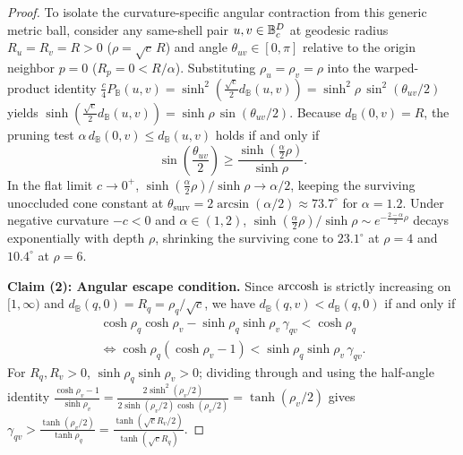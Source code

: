 \begin{proof}
To isolate the curvature-specific angular contraction from this generic metric ball, consider any same-shell pair $u, v \in \mathbb{B}_c^D$ at geodesic radius $R_u = R_v = R > 0$ ($\rho = \sqrt{c}\,R$) and angle $\theta_{uv} \in [0, \pi]$ relative to the origin neighbor $p = 0$ ($R_p = 0 < R/\alpha$).
Substituting $\rho_u = \rho_v = \rho$ into the warped-product identity $\frac{c}{4}P_{\mathbb{B}}(u, v) = \sinh^2(\frac{\sqrt{c}}{2}d_{\mathbb{B}}(u, v)) = \sinh^2\rho\,\sin^2(\theta_{uv}/2)$ yields $\sinh(\frac{\sqrt{c}}{2}d_{\mathbb{B}}(u, v)) = \sinh\rho\,\sin(\theta_{uv}/2)$.
Because $d_{\mathbb{B}}(0, v) = R$, the pruning test $\alpha\,d_{\mathbb{B}}(0, v) \le d_{\mathbb{B}}(u, v)$ holds if and only if
\begin{equation}
  \sin\!\left(\frac{\theta_{uv}}{2}\right) \ge \frac{\sinh\!\left(\frac{\alpha}{2}\rho\right)}{\sinh\rho}.
\end{equation}
In the flat limit $c \to 0^+$, $\sinh(\frac{\alpha}{2}\rho)/\sinh\rho \to \alpha / 2$, keeping the surviving unoccluded cone constant at $\theta_{\mathrm{surv}} = 2\arcsin(\alpha/2) \approx 73.7^\circ$ for $\alpha = 1.2$.
Under negative curvature $-c < 0$ and $\alpha \in (1, 2)$, $\sinh(\frac{\alpha}{2}\rho)/\sinh\rho \sim e^{-\frac{2-\alpha}{2}\rho}$ decays exponentially with depth $\rho$, shrinking the surviving cone to $23.1^\circ$ at $\rho = 4$ and $10.4^\circ$ at $\rho = 6$.

\textbf{Claim (2): Angular escape condition.}
Since $\operatorname{arccosh}$ is strictly increasing on $[1, \infty)$ and $d_{\mathbb{B}}(q, 0) = R_q = \rho_q / \sqrt{c}$, we have $d_{\mathbb{B}}(q, v) < d_{\mathbb{B}}(q, 0)$ if and only if
\begin{equation}
  \begin{gathered}
    \cosh\rho_q\cosh\rho_v - \sinh\rho_q\sinh\rho_v\,\gamma_{qv} < \cosh\rho_q \\
    \iff \cosh\rho_q(\cosh\rho_v - 1) < \sinh\rho_q\sinh\rho_v\,\gamma_{qv}.
  \end{gathered}
\end{equation}
For $R_q, R_v > 0$, $\sinh\rho_q\sinh\rho_v > 0$; dividing through and using the half-angle identity $\frac{\cosh\rho_v - 1}{\sinh\rho_v} = \frac{2\sinh^2(\rho_v/2)}{2\sinh(\rho_v/2)\cosh(\rho_v/2)} = \tanh(\rho_v/2)$ gives $\gamma_{qv} > \frac{\tanh(\rho_v/2)}{\tanh\rho_q} = \frac{\tanh(\sqrt{c}R_v/2)}{\tanh(\sqrt{c}R_q)}$.


\end{proof}
